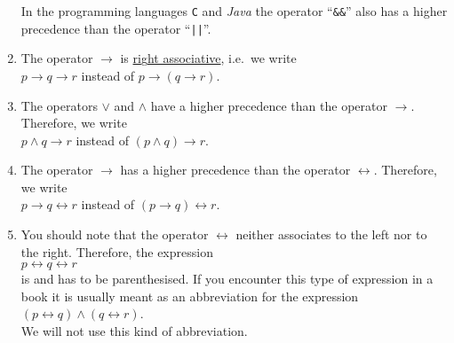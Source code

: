 \begin{enumerate}
      In the programming languages  \texttt{C} and \textsl{Java} the operator ``\texttt{\&\&}'' also has a higher
      precedence than the operator ``\texttt{||}''. 
\item The operator $\rightarrow$ is \underline{ri}g\underline{ht associative}, i.e.~we write \\[0.2cm]
      \hspace*{1.3cm} $p \rightarrow q \rightarrow r$ \quad instead of \quad $p \rightarrow (q \rightarrow r)$.
\item The operators  $\vee$ and $\wedge$ have a higher precedence than the operator $\rightarrow$.  Therefore,
      we write \\[0.2cm]
      \hspace*{1.3cm} $p \wedge q \rightarrow r$ \quad instead of \quad $(p \wedge q) \rightarrow r$.
\item The operator $\rightarrow$ has a higher precedence than the operator $\leftrightarrow$.  Therefore, we write \\[0.2cm]
      \hspace*{1.3cm} $p \rightarrow q \leftrightarrow r$ \quad instead of \quad $(p \rightarrow q) \leftrightarrow
      r$.
\item You should note that the operator $\leftrightarrow$ neither associates to the left nor to the right.
      Therefore, the expression
      \\[0.2cm]
      \hspace*{1.3cm}
      $p \leftrightarrow q \leftrightarrow r$
      \\[0.2cm]
      is \underline{\textbf{}} and has to be parenthesised.  If you encounter this type of expression
      in a book it is usually meant as an abbreviation for the expression
      \\[0.2cm]
      \hspace*{1.3cm}
      $(p \leftrightarrow q) \wedge (q \leftrightarrow r)$.
      \\[0.2cm]
      We will not use this kind of abbreviation.
\end{enumerate}

